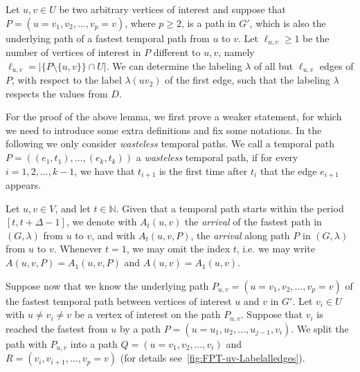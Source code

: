\documentclass[a4paper,UKenglish,cleveref, autoref, thm-restate, anonymous]{lipics-v2021}
\begin{document}
\begin{lemma}\label{lemma:FPT-uv-LabelAlmostalledges}
    Let $u, v \in U$ be two arbitrary vertices of interest and suppose that $P = (u=v_1, v_2, \dots, v_p = v)$, where $p \geq 2$, 
    is a path in $G'$, which is also the underlying path of a fastest temporal path from $u$ to $v$.
    Let $\ell_{u,v} \geq 1$ be the number of vertices of interest in $P$ different to $u,v$, namely $\ell_{u,v} = |\{P \setminus \{u,v \} \} \cap U |$.
    We can determine the labeling $\lambda$ of all but $\ell_{u,v}$ edges of $P$, with respect to the label $\lambda(uv_2)$ of the first edge,
    such that the labeling $\lambda$ respects the values from $D$.
\end{lemma}

For the proof of the above lemma, we first prove a weaker statement,
for which we need to introduce some extra definitions and fix some notations.
%
In the following
we only consider \emph{wasteless} temporal paths. 
We call 
a temporal path $P=((e_{1},t_{1}),\ldots ,(e_{k},t_{k}))$ a \emph{wasteless} temporal path, 
if for every $i=1,2,\ldots ,k-1$, we have that $t_{i+1}$ is the first time after $t_{i}$ that the edge $e_{i+1}$ appears. 

Let $u,v\in V$, and let $t\in \mathbb{N}$. 
Given that a temporal path starts within the period $[t,t+\Delta -1]$,
we denote with $A_{t}(u,v)$
the \emph{arrival} of the fastest path in $(G,\lambda )$ from $u$ to $v$, and
with $A_{t}(u,v,P)$,
the \emph{arrival} along path $P$ in $(G,\lambda )$ from $u$ to $v$.
%
Whenever $t=1$, we may omit the index $t$, i.e. we may write 
$A(u,v,P)=A_{1}(u,v,P)$ and $A(u,v)=A_{1}(u,v)$. 

Suppose now that 
we know the underlying path $P_{u,v} = (u=v_1, v_2, \dots, v_p = v)$ of the fastest temporal path between vertices of interest $u$ and $v$ in $G'$.
Let $v_i\in U$ with $u\neq v_i \neq v$ be a vertex of interest on the path $P_{u,v}$.
Suppose that $v_i$ is reached the fastest from $u$ by a path $P = (u = u_1, u_2, \dots, u_{j-1}, v_i)$.
We split the path with $P_{u,v}$ into a path $ Q = (u=v_1, v_2, \dots, v_i)$ and $R = (v_i, v_{i+1}, \dots, v_p=v)$
(for details see~\cref{fig:FPT-uv-Labelalledges}).
\end{document}

